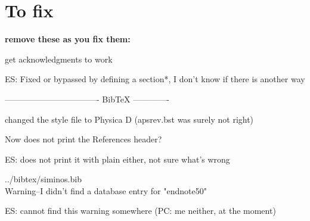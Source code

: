 
\section*{To fix}

{\bf remove these as you fix them:}


get 
acknowledgments to work

ES: Fixed or bypassed by defining a section*, I don't know if there is another way

---------------------------------- BibTeX -------------


changed the style file to Physica D (apsrev.bst was surely not right)

Now does not print the References header?

ES: does not print it with plain either, not sure what's wrong 

../bibtex/siminos.bib
\\
Warning--I didn't find a database entry for "endnote50"

ES: cannot find this warning somewhere 
(PC: me neither, at the moment)
